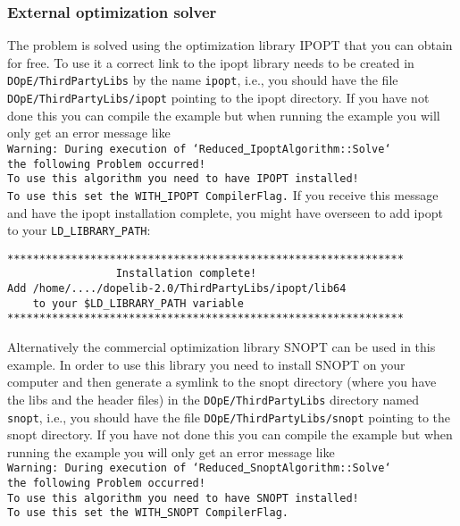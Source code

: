 \subsubsection{External optimization solver}
The problem is solved using the optimization library IPOPT that you can obtain for free. To use it 
a correct link to the ipopt library needs to be created in  \texttt{DOpE/ThirdPartyLibs} by the name 
\texttt{ipopt}, i.e., you should have the file
\texttt{DOpE/ThirdPartyLibs/ipopt} pointing to the ipopt directory. If you have not done this you can compile the
example but when running the example you will only get an error message like\\
\texttt{Warning: During execution of `Reduced\underline{ }IpoptAlgorithm::Solve`\\ the following Problem occurred!\\
To use this algorithm you need to have IPOPT installed! \\To use this set the WITH\underline{ }IPOPT CompilerFlag.}
If you receive this message and have the ipopt installation complete, you
might have overseen to add ipopt to your \texttt{LD\underline{ }LIBRARY\underline{ }PATH}:
\begin{lstlisting}
**************************************************************
                 Installation complete!
Add /home/..../dopelib-2.0/ThirdPartyLibs/ipopt/lib64
    to your $LD_LIBRARY_PATH variable
**************************************************************
\end{lstlisting}


Alternatively the commercial optimization library SNOPT can be used in this example.
In order to use this library you need to install SNOPT on your computer and then generate a symlink to 
the snopt directory (where you have the libs and the header files) 
in the \texttt{DOpE/ThirdPartyLibs} directory named \texttt{snopt}, i.e., you should have the file
\texttt{DOpE/ThirdPartyLibs/snopt} pointing to the snopt directory. If you have not done this you can compile the
example but when running the example you will only get an error message like\\
\texttt{Warning: During execution of `Reduced\underline{ }SnoptAlgorithm::Solve`\\ the following Problem occurred!\\
To use this algorithm you need to have SNOPT installed! \\To use this set the WITH\underline{ }SNOPT CompilerFlag.} 
